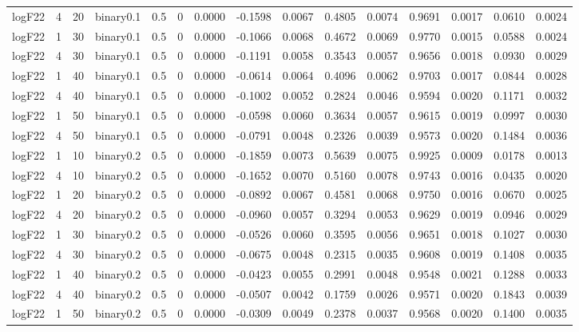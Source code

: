 \begin{longtable}{rrrrrrrrrrrrrrr}
  logF22 & 4 & 20 & binary0.1 & 0.5 & 0 & 0.0000 & -0.1598 & 0.0067 & 0.4805 & 0.0074 & 0.9691 & 0.0017 & 0.0610 & 0.0024 \\ 
  logF22 & 1 & 30 & binary0.1 & 0.5 & 0 & 0.0000 & -0.1066 & 0.0068 & 0.4672 & 0.0069 & 0.9770 & 0.0015 & 0.0588 & 0.0024 \\ 
  logF22 & 4 & 30 & binary0.1 & 0.5 & 0 & 0.0000 & -0.1191 & 0.0058 & 0.3543 & 0.0057 & 0.9656 & 0.0018 & 0.0930 & 0.0029 \\ 
  logF22 & 1 & 40 & binary0.1 & 0.5 & 0 & 0.0000 & -0.0614 & 0.0064 & 0.4096 & 0.0062 & 0.9703 & 0.0017 & 0.0844 & 0.0028 \\ 
  logF22 & 4 & 40 & binary0.1 & 0.5 & 0 & 0.0000 & -0.1002 & 0.0052 & 0.2824 & 0.0046 & 0.9594 & 0.0020 & 0.1171 & 0.0032 \\ 
  logF22 & 1 & 50 & binary0.1 & 0.5 & 0 & 0.0000 & -0.0598 & 0.0060 & 0.3634 & 0.0057 & 0.9615 & 0.0019 & 0.0997 & 0.0030 \\ 
  logF22 & 4 & 50 & binary0.1 & 0.5 & 0 & 0.0000 & -0.0791 & 0.0048 & 0.2326 & 0.0039 & 0.9573 & 0.0020 & 0.1484 & 0.0036 \\ 
  logF22 & 1 & 10 & binary0.2 & 0.5 & 0 & 0.0000 & -0.1859 & 0.0073 & 0.5639 & 0.0075 & 0.9925 & 0.0009 & 0.0178 & 0.0013 \\ 
  logF22 & 4 & 10 & binary0.2 & 0.5 & 0 & 0.0000 & -0.1652 & 0.0070 & 0.5160 & 0.0078 & 0.9743 & 0.0016 & 0.0435 & 0.0020 \\ 
  logF22 & 1 & 20 & binary0.2 & 0.5 & 0 & 0.0000 & -0.0892 & 0.0067 & 0.4581 & 0.0068 & 0.9750 & 0.0016 & 0.0670 & 0.0025 \\ 
  logF22 & 4 & 20 & binary0.2 & 0.5 & 0 & 0.0000 & -0.0960 & 0.0057 & 0.3294 & 0.0053 & 0.9629 & 0.0019 & 0.0946 & 0.0029 \\ 
  logF22 & 1 & 30 & binary0.2 & 0.5 & 0 & 0.0000 & -0.0526 & 0.0060 & 0.3595 & 0.0056 & 0.9651 & 0.0018 & 0.1027 & 0.0030 \\ 
  logF22 & 4 & 30 & binary0.2 & 0.5 & 0 & 0.0000 & -0.0675 & 0.0048 & 0.2315 & 0.0035 & 0.9608 & 0.0019 & 0.1408 & 0.0035 \\ 
  logF22 & 1 & 40 & binary0.2 & 0.5 & 0 & 0.0000 & -0.0423 & 0.0055 & 0.2991 & 0.0048 & 0.9548 & 0.0021 & 0.1288 & 0.0033 \\ 
  logF22 & 4 & 40 & binary0.2 & 0.5 & 0 & 0.0000 & -0.0507 & 0.0042 & 0.1759 & 0.0026 & 0.9571 & 0.0020 & 0.1843 & 0.0039 \\ 
  logF22 & 1 & 50 & binary0.2 & 0.5 & 0 & 0.0000 & -0.0309 & 0.0049 & 0.2378 & 0.0037 & 0.9568 & 0.0020 & 0.1400 & 0.0035 \\ 

\end{longtable}
